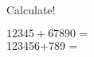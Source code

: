 \documentclass{exam}
\begin{document}
	\begin{questions}
		\question[5]  Calculate!
		
		\(12345 + 67890 = \) \fillin[80235] \hfill{}\vspace{2em} \\
		123456+789 =\fillin[123456] \hfill {}
	\end{questions}
\end{document}
